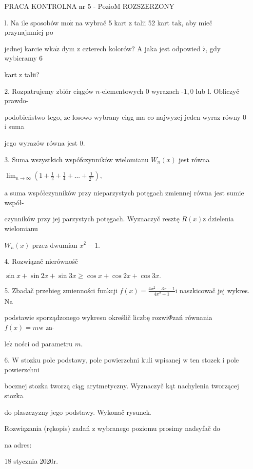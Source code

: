 \documentclass[a4paper,12pt]{article}
\begin{document}
PRACA KONTROLNA nr $5$ - PozioM ROZSZERZONY

l. Na ile sposobów $\mathrm{m}\mathrm{o}\dot{\mathrm{z}}$ na wybrač 5 kart $\mathrm{z}$ talii 52 kart $\mathrm{t}\mathrm{a}\mathrm{k}$, aby mieč przynajmniej po

jednej karcie $\mathrm{w}\mathrm{k}\mathrm{a}\dot{\mathrm{z}}$ dym $\mathrm{z}$ czterech kolorów? A jaka jest odpowied $\acute{\mathrm{z}}$, gdy wybieramy 6

kart $\mathrm{z}$ talii?

2. Rozpatrujemy zbiór ciągów $n$-elementowych $0$ wyrazach -$1, 0$ lub l. Obliczyč prawdo-

podobieństwo tego, $\dot{\mathrm{z}}\mathrm{e}$ losowo wybrany ciąg ma co najwyzej jeden wyraz równy 0 $\mathrm{i}$ suma

jego wyrazów równa jest 0.

3. Suma wszystkich wspófczynników wielomianu $W_{n}(x)$ jest równa

$\displaystyle \lim_{n\rightarrow\infty}(1+\frac{1}{2}+\frac{1}{4}+\ldots+\frac{1}{2^{n}}),$

a suma współczynników przy nieparzystych potęgach zmiennej równa jest sumie współ-

czynników przy jej parzystych potęgach. Wyznaczyč resztę $R(x)\mathrm{z}$ dzielenia wielomianu

$W_{n}(x)$ przez dwumian $x^{2}-1.$

4. Rozwiązač nierównośč

$\sin x+\sin 2x+\sin 3x\geq\cos x+\cos 2x+\cos 3x.$

5. Zbadač przebieg zmienności funkcji $f(x) = \displaystyle \frac{4x^{2}-3x-1}{4x^{2}+1} \mathrm{i}$ naszkicowač jej wykres. Na

podstawie sporządzonego wykresu określič liczbę rozwi$\Phi$zań równania $f(x) =m\mathrm{w}$ za-

$\mathrm{l}\mathrm{e}\dot{\mathrm{z}}$ ności od parametru $m.$

6. $\mathrm{W}$ stozku pole podstawy, pole powierzchni kuli wpisanej $\mathrm{w}$ ten stozek $\mathrm{i}$ pole powierzchni

bocznej stozka tworzą ciąg arytmetyczny. Wyznaczyč kąt nachylenia tworzącej stozka

do plaszczyzny jego podstawy. Wykonač rysunek.

Rozwiązania (rękopis) zadań z wybranego poziomu prosimy nadsyfač do

na adres:

18 stycznia 2020r.
\end{document}
